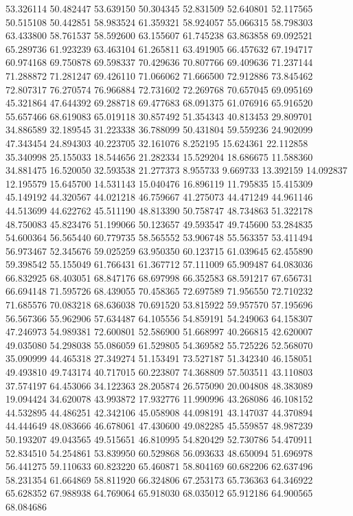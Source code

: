 53.326114
50.482447
53.639150
50.304345
52.831509
52.640801
52.117565
50.515108
50.442851
58.983524
61.359321
58.924057
55.066315
58.798303
63.433800
58.761537
58.592600
63.155607
61.745238
63.863858
69.092521
65.289736
61.923239
63.463104
61.265811
63.491905
66.457632
67.194717
60.974168
69.750878
69.598337
70.429636
70.807766
69.409636
71.237144
71.288872
71.281247
69.426110
71.066062
71.666500
72.912886
73.845462
72.807317
76.270574
76.966884
72.731602
72.269768
70.657045
69.095169
45.321864
47.644392
69.288718
69.477683
68.091375
61.076916
65.916520
55.657466
68.619083
65.019118
30.857492
51.354343
40.813453
29.809701
34.886589
32.189545
31.223338
36.788099
50.431804
59.559236
24.902099
47.343454
24.894303
40.223705
32.161076
8.252195
15.624361
22.112858
35.340998
25.155033
18.544656
21.282334
15.529204
18.686675
11.588360
34.881475
16.520050
32.593538
21.277373
8.955733
9.669733
13.392159
14.092837
12.195579
15.645700
14.531143
15.040476
16.896119
11.795835
15.415309
45.149192
44.320567
44.021218
46.759667
41.275073
44.471249
44.961146
44.513699
44.622762
45.511190
48.813390
50.758747
48.734863
51.322178
48.750083
45.823476
51.199066
50.123657
49.593547
49.745600
53.284835
54.600364
56.565440
60.779735
58.565552
53.906748
55.563357
53.411494
56.973467
52.345676
59.025259
63.950350
60.123715
61.039645
62.455890
59.398542
55.155049
61.766431
61.367712
57.111009
65.909487
64.083036
66.832925
68.403051
68.847176
68.697998
66.352583
68.591217
67.656731
66.694148
71.595726
68.439055
70.458365
72.697589
71.956550
72.710232
71.685576
70.083218
68.636038
70.691520
53.815922
59.957570
57.195696
56.567366
55.962906
57.634487
64.105556
54.859191
54.249063
64.158307
47.246973
54.989381
72.600801
52.586900
51.668997
40.266815
42.620007
49.035080
54.298038
55.086059
61.529805
54.369582
55.725226
52.568070
35.090999
44.465318
27.349274
51.153491
73.527187
51.342340
46.158051
49.493810
49.743174
40.717015
60.223807
74.368809
57.503511
43.110803
37.574197
64.453066
34.122363
28.205874
26.575090
20.004808
48.383089
19.094424
34.620078
43.993872
17.932776
11.990996
43.268086
46.108152
44.532895
44.486251
42.342106
45.058908
44.098191
43.147037
44.370894
44.444649
48.083666
46.678061
47.430600
49.082285
45.559857
48.987239
50.193207
49.043565
49.515651
46.810995
54.820429
52.730786
54.470911
52.834510
54.254861
53.839950
60.529868
56.093633
48.650094
51.696978
56.441275
59.110633
60.823220
65.460871
58.804169
60.682206
62.637496
58.231354
61.664869
58.811920
66.324806
67.253173
65.736363
64.346922
65.628352
67.988938
64.769064
65.918030
68.035012
65.912186
64.900565
68.084686
